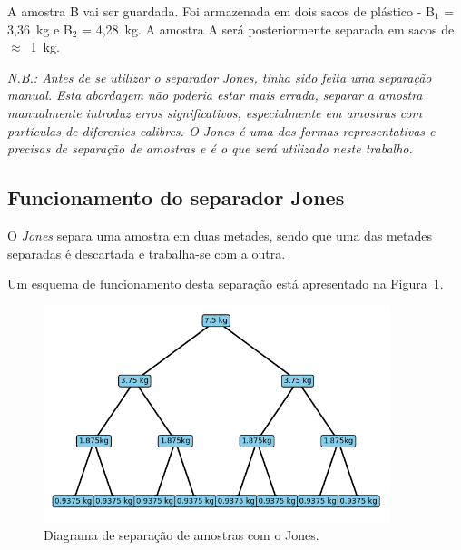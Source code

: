 A amostra B vai ser guardada.
Foi armazenada em dois sacos de plástico - B$_1$ = 3,36~kg e B$_2$ = 4,28~kg.
A amostra A será posteriormente separada em sacos de $\approx$~1~kg.

\hrulefill
\pagebreak


\textit{N.B.: Antes de se utilizar o separador \emph{Jones}, tinha sido feita uma separação manual. Esta abordagem não poderia estar mais errada, separar a amostra manualmente introduz erros significativos, especialmente em amostras com partículas de diferentes calibres. O Jones é uma das formas representativas e precisas de separação de amostras e é o que será utilizado neste trabalho.}


\subsection*{Funcionamento do separador Jones}

O \emph{Jones} separa uma amostra em duas metades, sendo que uma das metades separadas é descartada e trabalha-se com a outra.

Um esquema de funcionamento desta separação está apresentado na Figura~\ref{fig:diagrama_jones}.

\begin{figure}[!ht]
    \centering
    \includegraphics[width=0.9\textwidth]{figures/diagrama_jones}
    \caption{Diagrama de separação de amostras com o Jones.}
    \label{fig:diagrama_jones}
\end{figure}

